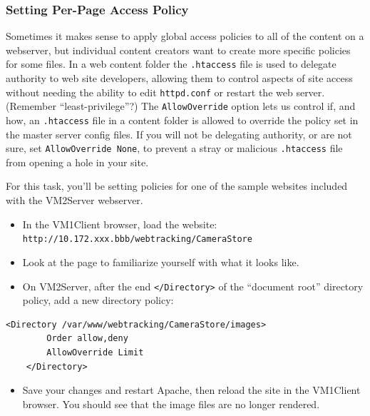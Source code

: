 \documentclass{article}
\begin{document}
\subsubsection{Setting Per-Page Access Policy}

Sometimes it makes sense to apply global access policies to all of the content on a webserver, but individual content creators want to create more specific policies for some files.  In a web content folder the {\tt .htaccess} file is used to delegate authority to web site developers, allowing them to control aspects of site access without needing the ability to edit {\tt httpd.conf} or restart the web server.  (Remember ``least-privilege''?)  The {\tt AllowOverride} option lets us control if, and how, an {\tt .htaccess} file in a content folder is allowed to override the policy set in the master server config files.  If you will not be delegating authority, or are not sure, set {\tt AllowOverride None}, to prevent a stray or malicious {\tt .htaccess} file from opening a hole in your site. 

For this task, you'll be setting policies for one of the sample websites included with the VM2Server webserver. 

\begin{itemize}
\item In the VM1Client browser, load the website:\\
{\tt http://10.172.xxx.bbb/webtracking/CameraStore}

\item Look at the page to familiarize yourself with what it looks like.  

\item On VM2Server, after the end {\tt </Directory>} of the ``document root'' directory policy, add a new directory policy:
\end{itemize}
\begin{Verbatim}[frame=single]
	<Directory /var/www/webtracking/CameraStore/images>
		Order allow,deny
		AllowOverride Limit
	</Directory>
\end{Verbatim}
\begin{itemize}
\item Save your changes and restart Apache, then reload the site in the VM1Client  browser. You should see that the image files are no longer rendered. 
\end{itemize}

\end{document}
